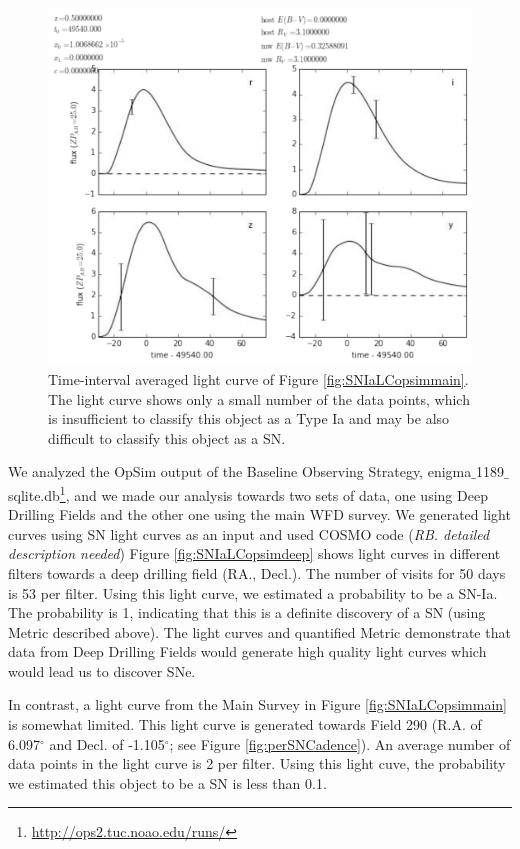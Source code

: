 \begin{figure}[tbh!]
\includegraphics[angle=0,width=0.99\hsize:,clip]{figs/SN_309_lcavg.pdf}
\caption{Time-interval averaged light curve of Figure \ref{fig:SNIaLCopsimmain}.
The light curve shows only a small number of the data points, which is insufficient
to classify this object as a Type Ia and may be also difficult to classify this object as
a SN. 
}
\label{fig:SNIaLCopsimmain2}
\end{figure}

We analyzed the OpSim output of the Baseline Observing Strategy,
enigma$\_$1189$\_$sqlite.db{\footnote {\url{http://ops2.tuc.noao.edu/runs/}}}, and we made
our analysis towards two sets of data, one using Deep Drilling Fields and the other one
using the main WFD survey. 
We generated light curves using SN light curves as an input and used COSMO code ({\it RB. detailed description needed}) 
Figure \ref{fig:SNIaLCopsimdeep} shows light curves in different
filters towards a deep drilling field (RA., Decl.). The number of visits for 50 days is 53
per filter. Using this light curve, we estimated a probability to be a SN-Ia.
The probability is 1, indicating that this is a definite discovery of a SN (using Metric
described above).   The light curves and quantified Metric demonstrate that data from Deep Drilling Fields
would generate high quality light curves which would lead us to discover SNe.

In contrast, a light curve from the Main Survey in Figure \ref{fig:SNIaLCopsimmain} is
somewhat limited. 
This light curve is generated towards Field 290 (R.A. of 6.097$^{\circ}$
and Decl. of -1.105$^{\circ}$; see Figure \ref{fig:perSNCadence}). An average number of
data points in the light curve is 2 per filter. Using this light cuve, the probability we
 estimated this object to be a SN is less than 0.1. 

